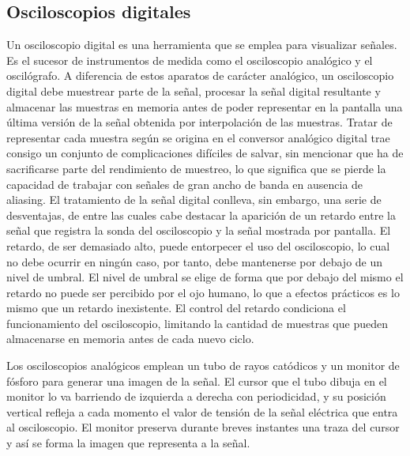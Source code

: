 \subsection{Osciloscopios digitales}

Un osciloscopio digital es una herramienta que se emplea para visualizar
señales. Es el sucesor de instrumentos de medida como el osciloscopio
analógico y el oscilógrafo. A diferencia de estos aparatos de carácter
analógico, un osciloscopio digital debe muestrear parte de la señal,
procesar la señal digital resultante y almacenar las muestras en memoria
antes de poder representar en la pantalla una última versión de la señal
obtenida por interpolación de las muestras. Tratar de representar cada
muestra según se origina en el conversor analógico digital trae consigo un
conjunto de complicaciones difíciles de salvar, sin mencionar que ha de
sacrificarse parte del rendimiento de muestreo, lo que significa que se
pierde la capacidad de trabajar con señales de gran ancho de banda en
ausencia de aliasing. El tratamiento de la señal digital conlleva, sin
embargo, una serie de desventajas, de entre las cuales cabe destacar la
aparición de un retardo entre la señal que registra la sonda del
osciloscopio y la señal mostrada por pantalla. El retardo, de ser demasiado
alto, puede entorpecer el uso del osciloscopio, lo cual no debe ocurrir en
ningún caso, por tanto, debe mantenerse por debajo de un nivel de umbral.
El nivel de umbral se elige de forma que por debajo del mismo el retardo no
puede ser percibido por el ojo humano, lo que a efectos prácticos es lo
mismo que un retardo inexistente. El control del retardo condiciona el
funcionamiento del osciloscopio, limitando la cantidad de muestras que
pueden almacenarse en memoria antes de cada nuevo ciclo.

Los osciloscopios analógicos emplean un tubo de rayos catódicos y un
monitor de fósforo para generar una imagen de la señal. El cursor que el
tubo dibuja en el monitor lo va barriendo de izquierda a derecha con
periodicidad, y su posición vertical refleja a cada momento el valor de
tensión de la señal eléctrica que entra al osciloscopio. El monitor
preserva durante breves instantes una traza del cursor y así se forma la
imagen que representa a la señal.

